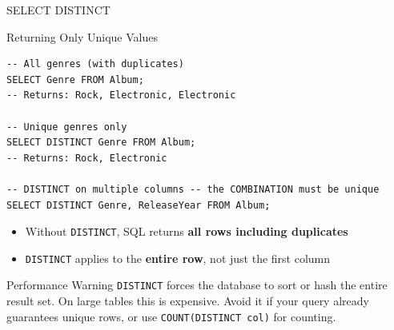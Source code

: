 \begin{frame}[fragile]{SELECT DISTINCT}
  \begin{block}{Returning Only Unique Values}
\begin{lstlisting}[style=sqlstyle]
-- All genres (with duplicates)
SELECT Genre FROM Album;
-- Returns: Rock, Electronic, Electronic

-- Unique genres only
SELECT DISTINCT Genre FROM Album;
-- Returns: Rock, Electronic

-- DISTINCT on multiple columns -- the COMBINATION must be unique
SELECT DISTINCT Genre, ReleaseYear FROM Album;
\end{lstlisting}
  \end{block}

  \begin{itemize}
    \item Without \texttt{DISTINCT}, SQL returns \textbf{all rows including duplicates}
    \item \texttt{DISTINCT} applies to the \textbf{entire row}, not just the first column
  \end{itemize}

  \begin{alertblock}{Performance Warning}
    \texttt{DISTINCT} forces the database to sort or hash the entire result set.
    On large tables this is expensive. Avoid it if your query already guarantees
    unique rows, or use \texttt{COUNT(DISTINCT col)} for counting.
  \end{alertblock}
\end{frame}

